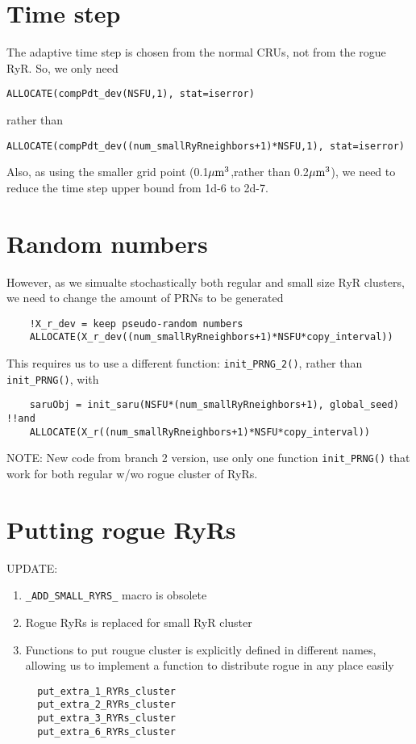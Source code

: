 \section{Time step}

The adaptive time step is chosen from the normal CRUs, not from the rogue RyR.
So, we only need
\begin{verbatim}
ALLOCATE(compPdt_dev(NSFU,1), stat=iserror)  
\end{verbatim}
rather than
\begin{verbatim}
ALLOCATE(compPdt_dev((num_smallRyRneighbors+1)*NSFU,1), stat=iserror)  
\end{verbatim}

Also, as using the smaller grid point (0.1${\mu\text{m}}^3$,rather than 0.2${\mu\text{m}}^3$), we
need to reduce the time step upper bound from 1d-6 to 2d-7. 

\section{Random numbers}

However, as we simualte stochastically both regular and small size RyR
clusters, we need to change the amount of PRNs to be generated
\begin{verbatim}    
    !X_r_dev = keep pseudo-random numbers
    ALLOCATE(X_r_dev((num_smallRyRneighbors+1)*NSFU*copy_interval)) 
\end{verbatim}
This requires us to use a different function: \verb!init_PRNG_2()!, rather than
\verb!init_PRNG()!, with
\begin{verbatim}
    saruObj = init_saru(NSFU*(num_smallRyRneighbors+1), global_seed)
!!and
    ALLOCATE(X_r((num_smallRyRneighbors+1)*NSFU*copy_interval))
\end{verbatim}

\begin{framed}
NOTE: New code from branch 2 version, use only one function \verb!init_PRNG()!
that work for both regular w/wo rogue cluster of RyRs. 
\end{framed}

\section{Putting rogue RyRs}

UPDATE:
\begin{enumerate}
  \item \verb!_ADD_SMALL_RYRS_! macro is obsolete
  \item Rogue RyRs is replaced for small RyR cluster
  \item Functions to put rougue cluster is explicitly defined in different
  names, allowing us to implement a function to distribute rogue in any place
  easily
  \begin{verbatim}
  put_extra_1_RYRs_cluster
  put_extra_2_RYRs_cluster
  put_extra_3_RYRs_cluster
  put_extra_6_RYRs_cluster
  \end{verbatim}
\end{enumerate}

